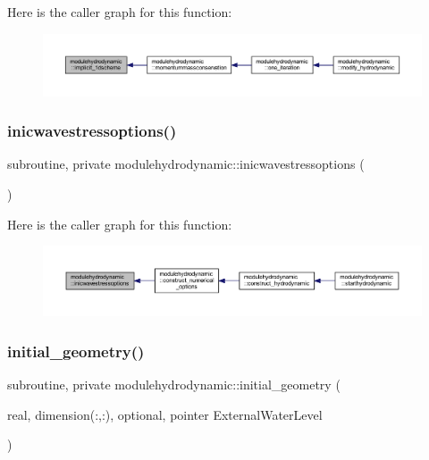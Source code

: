 Here is the caller graph for this function\+:\nopagebreak
\begin{figure}[H]
\begin{center}
\leavevmode
\includegraphics[width=350pt]{namespacemodulehydrodynamic_aad271ff300fe974ab4d13ed6f1bd315d_icgraph}
\end{center}
\end{figure}
\mbox{\label{namespacemodulehydrodynamic_a95bd184509c8f6ec79226d6c0d2fac28}} 
\subsubsection{\texorpdfstring{inicwavestressoptions()}{inicwavestressoptions()}}
{\footnotesize\ttfamily subroutine, private modulehydrodynamic\+::inicwavestressoptions (\begin{DoxyParamCaption}{ }\end{DoxyParamCaption})\hspace{0.3cm}{\ttfamily [private]}}

Here is the caller graph for this function\+:\nopagebreak
\begin{figure}[H]
\begin{center}
\leavevmode
\includegraphics[width=350pt]{namespacemodulehydrodynamic_a95bd184509c8f6ec79226d6c0d2fac28_icgraph}
\end{center}
\end{figure}
\mbox{\label{namespacemodulehydrodynamic_aed12798a19237f32da3dbf20b90a6e41}} 
\subsubsection{\texorpdfstring{initial\+\_\+geometry()}{initial\_geometry()}}
{\footnotesize\ttfamily subroutine, private modulehydrodynamic\+::initial\+\_\+geometry (\begin{DoxyParamCaption}\item[{real, dimension(\+:,\+:), optional, pointer}]{External\+Water\+Level }\end{DoxyParamCaption})\hspace{0.3cm}{\ttfamily [private]}}

